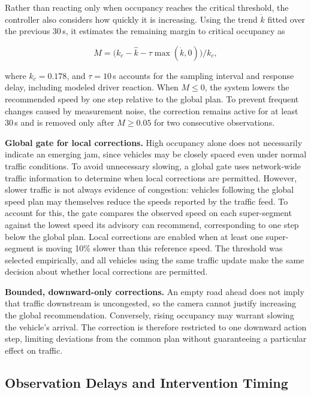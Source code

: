 \documentclass[letterpaper, 10pt, journal, twoside]{IEEEtran}
\begin{document}
Rather than reacting only when occupancy reaches the critical threshold, the controller also considers how quickly it is increasing. Using the trend $\dot{k}$ fitted over the previous 30\,s, it estimates the remaining margin to critical occupancy as

\begin{equation}
M=\bigl(k_c-\hat{k}-\tau\max(\dot{k},0)\bigr)/k_c,
\label{eq:margin}
\end{equation}

where $k_c=0.178$, and $\tau=10$\,s accounts for the sampling interval and response delay, including modeled driver reaction. When $M\leq 0$, the system lowers the recommended speed by one step relative to the global plan. To prevent frequent changes caused by measurement noise, the correction remains active for at least 30\,s and is removed only after $M\geq 0.05$ for two consecutive observations.

\noindent\textbf{Global gate for local corrections.} High occupancy alone does not necessarily indicate an emerging jam, since vehicles may be closely spaced even under normal traffic conditions. To avoid unnecessary slowing, a global gate uses network-wide traffic information to determine when local corrections are permitted. However, slower traffic is not always evidence of congestion: vehicles following the global speed plan may themselves reduce the speeds reported by the traffic feed. To account for this, the gate compares the observed speed on each super-segment against the lowest speed its advisory can recommend, corresponding to one step below the global plan. Local corrections are enabled when at least one super-segment is moving 10\% slower than this reference speed. The threshold was selected empirically, and all vehicles using the same traffic update make the same decision about whether local corrections are permitted.

\noindent\textbf{Bounded, downward-only corrections.} An empty road ahead does not imply that traffic downstream is uncongested, so the camera cannot justify increasing the global recommendation. Conversely, rising occupancy may warrant slowing the vehicle's arrival. The correction is therefore restricted to one downward action step, limiting deviations from the common plan without guaranteeing a particular effect on traffic.

\subsection{Observation Delays and Intervention Timing}
\end{document}
